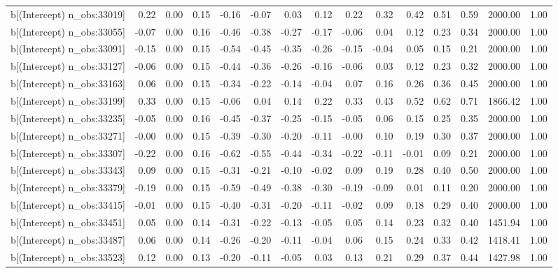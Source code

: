 \begin{table}[ht]
\begin{tabular}{rrrrrrrrrrrrrrr}
  b[(Intercept) n\_obs:33019] & 0.22 & 0.00 & 0.15 & -0.16 & -0.07 & 0.03 & 0.12 & 0.22 & 0.32 & 0.42 & 0.51 & 0.59 & 2000.00 & 1.00 \\ 
  b[(Intercept) n\_obs:33055] & -0.07 & 0.00 & 0.16 & -0.46 & -0.38 & -0.27 & -0.17 & -0.06 & 0.04 & 0.12 & 0.23 & 0.34 & 2000.00 & 1.00 \\ 
  b[(Intercept) n\_obs:33091] & -0.15 & 0.00 & 0.15 & -0.54 & -0.45 & -0.35 & -0.26 & -0.15 & -0.04 & 0.05 & 0.15 & 0.21 & 2000.00 & 1.00 \\ 
  b[(Intercept) n\_obs:33127] & -0.06 & 0.00 & 0.15 & -0.44 & -0.36 & -0.26 & -0.16 & -0.06 & 0.03 & 0.12 & 0.23 & 0.32 & 2000.00 & 1.00 \\ 
  b[(Intercept) n\_obs:33163] & 0.06 & 0.00 & 0.15 & -0.34 & -0.22 & -0.14 & -0.04 & 0.07 & 0.16 & 0.26 & 0.36 & 0.45 & 2000.00 & 1.00 \\ 
  b[(Intercept) n\_obs:33199] & 0.33 & 0.00 & 0.15 & -0.06 & 0.04 & 0.14 & 0.22 & 0.33 & 0.43 & 0.52 & 0.62 & 0.71 & 1866.42 & 1.00 \\ 
  b[(Intercept) n\_obs:33235] & -0.05 & 0.00 & 0.16 & -0.45 & -0.37 & -0.25 & -0.15 & -0.05 & 0.06 & 0.15 & 0.25 & 0.35 & 2000.00 & 1.00 \\ 
  b[(Intercept) n\_obs:33271] & -0.00 & 0.00 & 0.15 & -0.39 & -0.30 & -0.20 & -0.11 & -0.00 & 0.10 & 0.19 & 0.30 & 0.37 & 2000.00 & 1.00 \\ 
  b[(Intercept) n\_obs:33307] & -0.22 & 0.00 & 0.16 & -0.62 & -0.55 & -0.44 & -0.34 & -0.22 & -0.11 & -0.01 & 0.09 & 0.21 & 2000.00 & 1.00 \\ 
  b[(Intercept) n\_obs:33343] & 0.09 & 0.00 & 0.15 & -0.31 & -0.21 & -0.10 & -0.02 & 0.09 & 0.19 & 0.28 & 0.40 & 0.50 & 2000.00 & 1.00 \\ 
  b[(Intercept) n\_obs:33379] & -0.19 & 0.00 & 0.15 & -0.59 & -0.49 & -0.38 & -0.30 & -0.19 & -0.09 & 0.01 & 0.11 & 0.20 & 2000.00 & 1.00 \\ 
  b[(Intercept) n\_obs:33415] & -0.01 & 0.00 & 0.15 & -0.40 & -0.31 & -0.20 & -0.11 & -0.02 & 0.09 & 0.18 & 0.29 & 0.40 & 2000.00 & 1.00 \\ 
  b[(Intercept) n\_obs:33451] & 0.05 & 0.00 & 0.14 & -0.31 & -0.22 & -0.13 & -0.05 & 0.05 & 0.14 & 0.23 & 0.32 & 0.40 & 1451.94 & 1.00 \\ 
  b[(Intercept) n\_obs:33487] & 0.06 & 0.00 & 0.14 & -0.26 & -0.20 & -0.11 & -0.04 & 0.06 & 0.15 & 0.24 & 0.33 & 0.42 & 1418.41 & 1.00 \\ 
  b[(Intercept) n\_obs:33523] & 0.12 & 0.00 & 0.13 & -0.20 & -0.11 & -0.05 & 0.03 & 0.13 & 0.21 & 0.29 & 0.37 & 0.44 & 1427.98 & 1.00 \\ 

\end{tabular}
\end{table}
